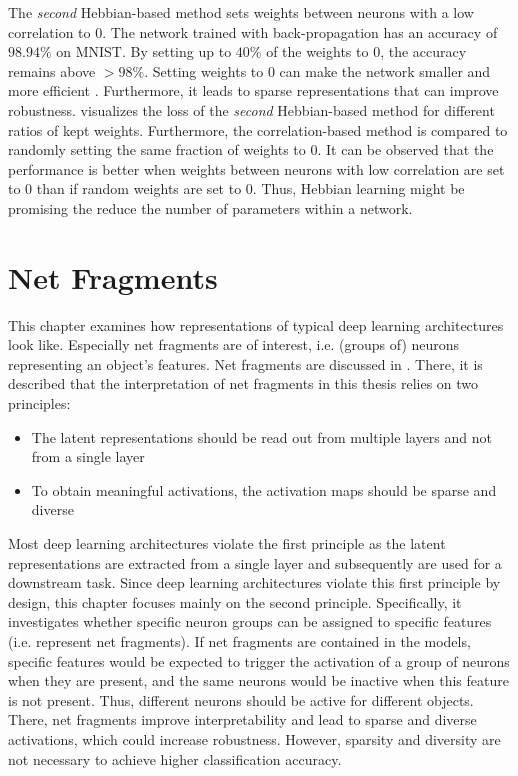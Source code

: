 The \emph{second} Hebbian-based method sets weights between neurons with a low correlation to \(0\).
The network trained with back-propagation has an accuracy of \(98.94\%\) on MNIST.
By setting up to \(40\%\) of the weights to \(0\), the accuracy remains above \(>98\%\).
Setting weights to \(0\) can make the network smaller and more efficient .
Furthermore, it leads to sparse representations that can improve robustness.
 visualizes the loss of the \emph{second} Hebbian-based method for different ratios of kept weights.
Furthermore, the correlation-based method is compared to randomly setting the same fraction of weights to \(0\).
It can be observed that the performance is better when weights between neurons with low correlation are set to \(0\) than if random weights are set to \(0\).
Thus, Hebbian learning might be promising the reduce the number of parameters within a network.




\pagebreak
\chapter{Net Fragments}
This chapter examines how representations of typical deep learning architectures look like.
Especially net fragments are of interest, i.e. (groups of) neurons representing an object's features.
Net fragments are discussed in .
There, it is described that the interpretation of net fragments in this thesis relies on two principles:

\begin{itemize}
	\item The latent representations should be read out from multiple layers and not from a single layer
	\item To obtain meaningful activations, the activation maps should be sparse and diverse
\end{itemize}


Most deep learning architectures violate the first principle as the latent representations are extracted from a single layer and subsequently are used for a downstream task.
Since deep learning architectures violate this first principle by design, this chapter focuses mainly on the second principle. Specifically, it investigates whether specific neuron groups can be assigned to specific features (i.e. represent net fragments). 
If net fragments are contained in the models, specific features would be expected to trigger the activation of a group of neurons when they are present, and the same neurons would be inactive when this feature is not present. Thus, different neurons should be active for different objects.
There, net fragments improve interpretability and lead to sparse and diverse activations, which could increase robustness.
However, sparsity and diversity are not necessary to achieve higher classification accuracy.

